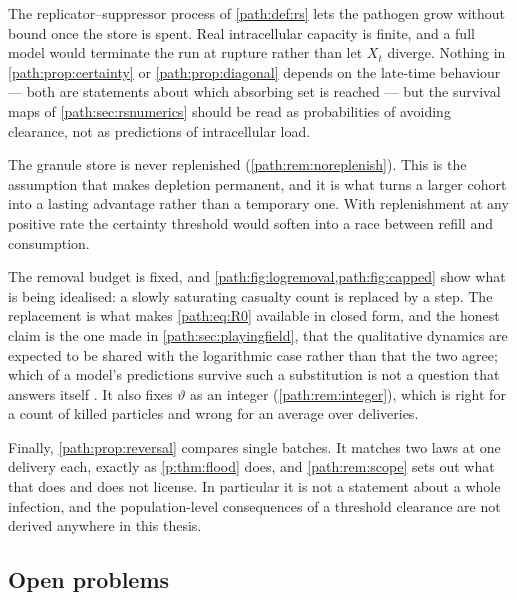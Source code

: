 The replicator--suppressor process of \cref{path:def:rs} lets the pathogen
grow without bound once the store is spent. Real intracellular capacity is
finite, and a full model would terminate the run at rupture rather than let
$X_t$ diverge. Nothing in \cref{path:prop:certainty} or
\cref{path:prop:diagonal} depends on the late-time behaviour --- both are
statements about which absorbing set is reached --- but the survival maps of
\cref{path:sec:rsnumerics} should be read as probabilities of avoiding
clearance, not as predictions of intracellular load.

The granule store is never replenished (\cref{path:rem:noreplenish}). This
is the assumption that makes depletion permanent, and it is what turns a
larger cohort into a lasting advantage rather than a temporary one. With
replenishment at any positive rate the certainty threshold would soften into
a race between refill and consumption.

The removal budget is fixed, and \cref{path:fig:logremoval,path:fig:capped}
show what is being idealised: a slowly saturating casualty count is replaced by a
step. The replacement is what makes \cref{path:eq:R0} available in closed
form, and the honest claim is the one made in \cref{path:sec:playingfield},
that the qualitative dynamics are expected to be shared with the logarithmic
case rather than that the two agree; which of a model's predictions survive
such a substitution is not a question that answers itself
\cite{deboer2012our}. It also fixes $\vartheta$ as an integer
(\cref{path:rem:integer}), which is right for a count of killed particles
and wrong for an average over deliveries.

Finally, \cref{path:prop:reversal} compares single batches. It matches two
laws at one delivery each, exactly as \cref{p:thm:flood} does, and
\cref{path:rem:scope} sets out what that does and does not license. In
particular it is not a statement about a whole infection, and the
population-level consequences of a threshold clearance are not derived
anywhere in this thesis.

\subsection{Open problems}
\label{path:sec:open}

